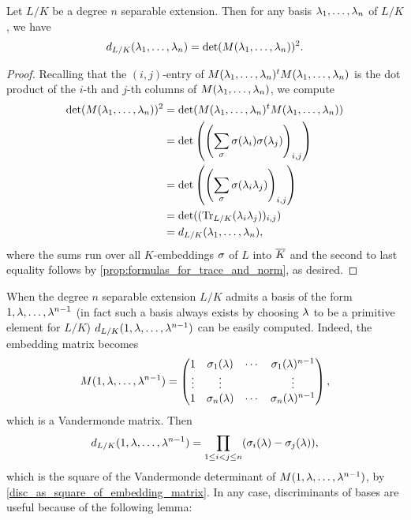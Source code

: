     \begin{proposition}\label{disc_as_square_of_embedding_matrix}
      Let $L/K$ be a degree $n$ separable extension. Then for any basis $\lambda_{1},\ldots,\lambda_{n}$ of $L/K$, we have
      \[
        d_{L/K}(\lambda_{1},\ldots,\lambda_{n}) = \det(M(\lambda_{1},\ldots,\lambda_{n}))^{2}.
      \]
    \end{proposition}
    \begin{proof}
      Recalling that the $(i,j)$-entry of $M(\lambda_{1},\ldots,\lambda_{n})^{t}M(\lambda_{1},\ldots,\lambda_{n})$ is the dot product of the $i$-th and $j$-th columns of $M(\lambda_{1},\ldots,\lambda_{n})$, we compute
      \begin{align*}
        \det(M(\lambda_{1},\ldots,\lambda_{n}))^{2} &= \det(M(\lambda_{1},\ldots,\lambda_{n})^{t}M(\lambda_{1},\ldots,\lambda_{n})) \\
        &= \det\left(\left(\sum_{\sigma}\sigma(\lambda_{i})\sigma(\lambda_{j})\right)_{i,j}\right) \\
        &= \det\left(\left(\sum_{\sigma}\sigma(\lambda_{i}\lambda_{j})\right)_{i,j}\right) \\
        &= \det((\operatorname{\mathrm{Tr}}_{L/K}(\lambda_{i}\lambda_{j}))_{i,j}) \\
        &= d_{L/K}(\lambda_{1},\ldots,\lambda_{n}),
      \end{align*}
      where the sums run over all $K$-embeddings $\sigma$ of $L$ into $\overline{K}$ and the second to last equality follows by \cref{prop:formulas_for_trace_and_norm}, as desired.
    \end{proof}

    When the degree $n$ separable extension $L/K$ admits a basis of the form $1,\lambda,\ldots,\lambda^{n-1}$ (in fact such a basis always exists by choosing $\lambda$ to be a primitive element for $L/K$) $d_{L/K}(1,\lambda,\ldots,\lambda^{n-1})$ can be easily computed. Indeed, the embedding matrix becomes
    \[
      M(1,\lambda,\ldots,\lambda^{n-1}) = \begin{pmatrix} 1 & \sigma_{1}(\lambda) & \cdots & \sigma_{1}(\lambda)^{n-1} \\ \vdots & \vdots & & \vdots \\ 1 & \sigma_{n}(\lambda) & \cdots & \sigma_{n}(\lambda)^{n-1} \end{pmatrix},
    \]
    which is a Vandermonde matrix. Then
    \begin{equation}\label{equ:Vandermonde_determinant_for_discriminant}
      d_{L/K}(1,\lambda,\ldots,\lambda^{n-1}) = \prod_{1 \le i < j \le n}(\sigma_{i}(\lambda)-\sigma_{j}(\lambda)),
    \end{equation}
    which is the square of the Vandermonde determinant of $M(1,\lambda,\ldots,\lambda^{n-1})$, by \cref{disc_as_square_of_embedding_matrix}. In any case, discriminants of bases are useful because of the following lemma:

